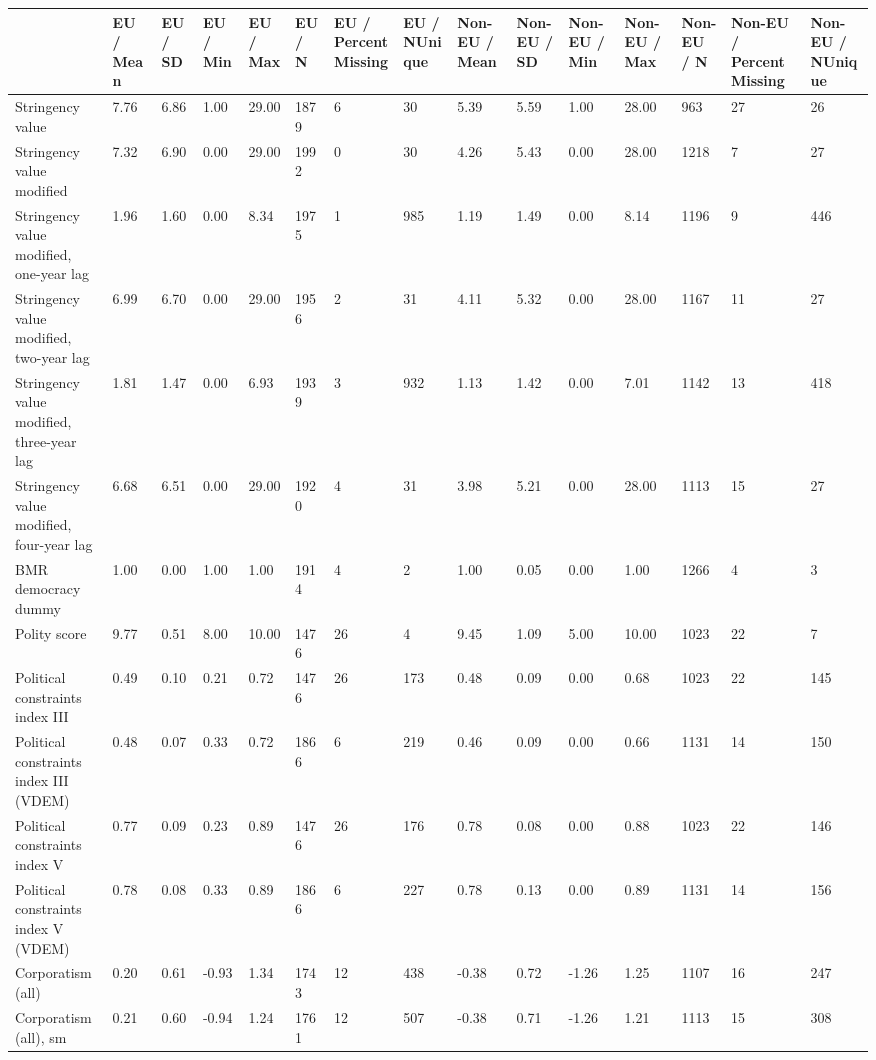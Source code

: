 
\begin{longtable}{lllllllllllllll}
\toprule
  & EU / Mean & EU / SD & EU / Min & EU / Max & EU / N & EU / PercentMissing & EU / NUnique & Non-EU / Mean & Non-EU / SD & Non-EU / Min & Non-EU / Max & Non-EU / N & Non-EU / PercentMissing & Non-EU / NUnique\\
\midrule
Stringency value & 7.76 & 6.86 & 1.00 & 29.00 & 1879 & 6 & 30 & 5.39 & 5.59 & 1.00 & 28.00 & 963 & 27 & 26\\
Stringency value modified & 7.32 & 6.90 & 0.00 & 29.00 & 1992 & 0 & 30 & 4.26 & 5.43 & 0.00 & 28.00 & 1218 & 7 & 27\\
Stringency value modified, one-year lag & 1.96 & 1.60 & 0.00 & 8.34 & 1975 & 1 & 985 & 1.19 & 1.49 & 0.00 & 8.14 & 1196 & 9 & 446\\
Stringency value modified, two-year lag & 6.99 & 6.70 & 0.00 & 29.00 & 1956 & 2 & 31 & 4.11 & 5.32 & 0.00 & 28.00 & 1167 & 11 & 27\\
Stringency value modified, three-year lag & 1.81 & 1.47 & 0.00 & 6.93 & 1939 & 3 & 932 & 1.13 & 1.42 & 0.00 & 7.01 & 1142 & 13 & 418\\
\addlinespace
Stringency value modified, four-year lag & 6.68 & 6.51 & 0.00 & 29.00 & 1920 & 4 & 31 & 3.98 & 5.21 & 0.00 & 28.00 & 1113 & 15 & 27\\
BMR democracy dummy & 1.00 & 0.00 & 1.00 & 1.00 & 1914 & 4 & 2 & 1.00 & 0.05 & 0.00 & 1.00 & 1266 & 4 & 3\\
Polity score & 9.77 & 0.51 & 8.00 & 10.00 & 1476 & 26 & 4 & 9.45 & 1.09 & 5.00 & 10.00 & 1023 & 22 & 7\\
Political constraints index III & 0.49 & 0.10 & 0.21 & 0.72 & 1476 & 26 & 173 & 0.48 & 0.09 & 0.00 & 0.68 & 1023 & 22 & 145\\
Political constraints index III (VDEM) & 0.48 & 0.07 & 0.33 & 0.72 & 1866 & 6 & 219 & 0.46 & 0.09 & 0.00 & 0.66 & 1131 & 14 & 150\\
\addlinespace
Political constraints index V & 0.77 & 0.09 & 0.23 & 0.89 & 1476 & 26 & 176 & 0.78 & 0.08 & 0.00 & 0.88 & 1023 & 22 & 146\\
Political constraints index V (VDEM) & 0.78 & 0.08 & 0.33 & 0.89 & 1866 & 6 & 227 & 0.78 & 0.13 & 0.00 & 0.89 & 1131 & 14 & 156\\
Corporatism (all) & 0.20 & 0.61 & -0.93 & 1.34 & 1743 & 12 & 438 & -0.38 & 0.72 & -1.26 & 1.25 & 1107 & 16 & 247\\
Corporatism (all), sm & 0.21 & 0.60 & -0.94 & 1.24 & 1761 & 12 & 507 & -0.38 & 0.71 & -1.26 & 1.21 & 1113 & 15 & 308\\

\end{longtable}
